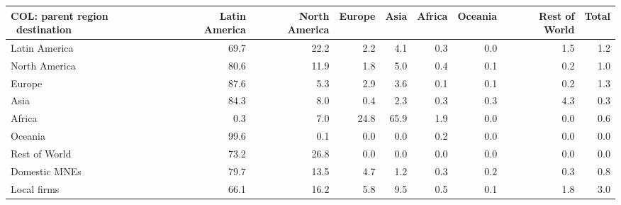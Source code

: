 \begin{tabular}{lrrrrrrrr}
\toprule
COL: parent region \ destination & Latin America & North America & Europe & Asia & Africa & Oceania & Rest of World & Total \\
\midrule
Latin America & 69.7 & 22.2 & 2.2 & 4.1 & 0.3 & 0.0 & 1.5 & 1.2 \\
North America & 80.6 & 11.9 & 1.8 & 5.0 & 0.4 & 0.1 & 0.2 & 1.0 \\
Europe & 87.6 & 5.3 & 2.9 & 3.6 & 0.1 & 0.1 & 0.2 & 1.3 \\
Asia & 84.3 & 8.0 & 0.4 & 2.3 & 0.3 & 0.3 & 4.3 & 0.3 \\
Africa & 0.3 & 7.0 & 24.8 & 65.9 & 1.9 & 0.0 & 0.0 & 0.6 \\
Oceania & 99.6 & 0.1 & 0.0 & 0.0 & 0.2 & 0.0 & 0.0 & 0.0 \\
Rest of World & 73.2 & 26.8 & 0.0 & 0.0 & 0.0 & 0.0 & 0.0 & 0.0 \\
Domestic MNEs & 79.7 & 13.5 & 4.7 & 1.2 & 0.3 & 0.2 & 0.3 & 0.8 \\
Local firms & 66.1 & 16.2 & 5.8 & 9.5 & 0.5 & 0.1 & 1.8 & 3.0 \\
\bottomrule
\end{tabular}
